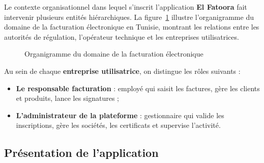 \documentclass[a4paper,12pt]{report}
\newcommand{\elfattoora}{\textbf{El Fatoora}}
\begin{document}
Le contexte organisationnel dans lequel s'inscrit l'application \elfattoora{} fait intervenir plusieurs entités hiérarchiques. La figure~\ref{fig:organigramme} illustre l'organigramme du domaine de la facturation électronique en Tunisie, montrant les relations entre les autorités de régulation, l'opérateur technique et les entreprises utilisatrices.

\begin{figure}[htbp]
\centering
{}
\caption{Organigramme du domaine de la facturation électronique}
\label{fig:organigramme}
\end{figure}

Au sein de chaque \textbf{entreprise utilisatrice}, on distingue les rôles suivants :
\begin{itemize}[nosep]
    \item \textbf{Le responsable facturation} : employé qui saisit les factures, gère les clients et produits, lance les signatures ;
    \item \textbf{L'administrateur de la plateforme} : gestionnaire qui valide les inscriptions, gère les sociétés, les certificats et supervise l'activité.
\end{itemize}

\subsection{Présentation de l'application}
\end{document}
